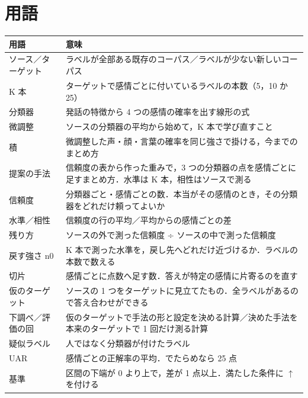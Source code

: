 \documentclass[a4paper,11pt]{ltjsarticle}
\begin{document}
\section{用語}
\begin{center}
\small
\begin{tabular}{>{\raggedright}p{3.6cm}p{11.8cm}}
\toprule
用語 & 意味 \\
\midrule
ソース／ターゲット & ラベルが全部ある既存のコーパス／ラベルが少ない新しいコーパス \\
K 本 & ターゲットで感情ごとに付いているラベルの本数（5，10 か 25） \\
分類器 & 発話の特徴から 4 つの感情の確率を出す線形の式 \\
微調整 & ソースの分類器の平均から始めて，K 本で学び直すこと \\
積 & 微調整した声・顔・言葉の確率を同じ強さで掛ける，今までのまとめ方 \\
提案の手法 & 信頼度の表から作った重みで，3 つの分類器の点を感情ごとに足すまとめ方．水準は K 本，相性はソースで測る \\
信頼度 & 分類器ごと・感情ごとの数．本当がその感情のとき，その分類器をどれだけ頼ってよいか \\
水準／相性 & 信頼度の行の平均／平均からの感情ごとの差 \\
残り方 & ソースの外で測った信頼度 ÷ ソースの中で測った信頼度 \\
戻す強さ n0 & K 本で測った水準を，戻し先へどれだけ近づけるか．ラベルの本数で数える \\
切片 & 感情ごとに点数へ足す数．答えが特定の感情に片寄るのを直す \\
仮のターゲット & ソースの 1 つをターゲットに見立てたもの．全ラベルがあるので答え合わせができる \\
下調べ／評価の回 & 仮のターゲットで手法の形と設定を決める計算／決めた手法を本来のターゲットで 1 回だけ測る計算 \\
疑似ラベル & 人ではなく分類器が付けたラベル \\
UAR & 感情ごとの正解率の平均．でたらめなら 25 点 \\
基準 & 区間の下端が 0 より上で，差が 1 点以上．満たした条件に $\uparrow$ を付ける \\
\bottomrule
\end{tabular}
\end{center}
\end{document}
